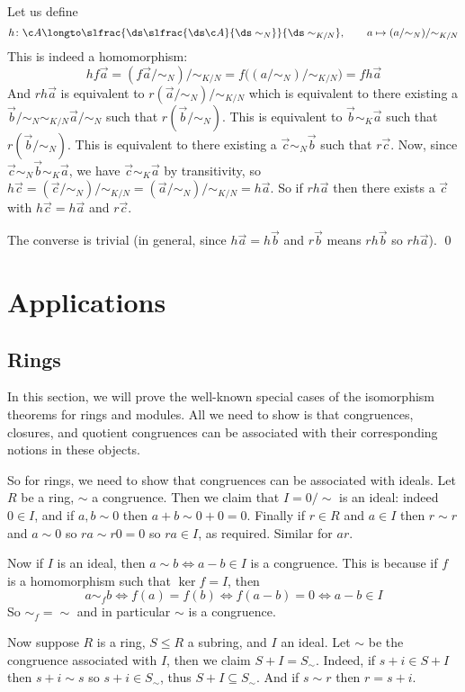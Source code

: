     \item Let us define
    $$ h\colon\c A\longto\slfrac{\ds\slfrac{\ds\c A}{\ds\sim_N}}{\ds\sim_{K/N}},\qquad a\mapsto(a/{\sim_N})/{\sim_{K/N}} $$
    This is indeed a homomorphism:
    $$ hf\vec a = (f\vec a/{\sim_N})/{\sim_{K/N}} = f\bigl((a/{\sim_N})/{\sim_{K/N}}\bigr) = fh\vec a $$
    And $rh\vec a$ is equivalent to $r(\vec a/{\sim_N})/{\sim_{K/N}}$ which is equivalent to there existing a $\vec b/{\sim_N}\sim_{K/N}\vec a/{\sim_N}$ such that $r(\vec b/{\sim_N})$.
    This is equivalent to $\vec b\sim_K\vec a$ such that $r(\vec b/{\sim_N})$.
    This is equivalent to there existing a $\vec c\sim_N\vec b$ such that $r\vec c$.
    Now, since $\vec c\sim_N\vec b\sim_K\vec a$, we have $\vec c\sim_K\vec a$ by transitivity, so $h\vec c=(\vec c/{\sim_N})/{\sim_{K/N}}=(\vec a/{\sim_N})/{\sim_{K/N}}=h\vec a$.
    So if $rh\vec a$ then there exists a $\vec c$ with $h\vec c=h\vec a$ and $r\vec c$.

    The converse is trivial (in general, since $h\vec a=h\vec b$ and $r\vec b$ means $rh\vec b$ so $rh\vec a$).
    \qed
\eenum

\section{Applications}

\subsection{Rings}

In this section, we will prove the well-known special cases of the isomorphism theorems for rings and modules.
All we need to show is that congruences, closures, and quotient congruences can be associated with their corresponding notions in these objects.

So for rings, we need to show that congruences can be associated with ideals.
Let $R$ be a ring, $\sim$ a congruence.
Then we claim that $I=0/{\sim}$ is an ideal: indeed $0\in I$, and if $a,b\sim0$ then $a+b\sim0+0=0$.
Finally if $r\in R$ and $a\in I$ then $r\sim r$ and $a\sim0$ so $ra\sim r0=0$ so $ra\in I$, as required.
Similar for $ar$.

Now if $I$ is an ideal, then $a\sim b\iff a-b\in I$ is a congruence.
This is because if $f$ is a homomorphism such that $\ker f=I$, then
$$ a\sim_fb \iff f(a)=f(b) \iff f(a-b) = 0 \iff a-b\in I $$
So $\sim_f=\sim$ and in particular $\sim$ is a congruence.

Now suppose $R$ is a ring, $S\leq R$ a subring, and $I$ an ideal.
Let $\sim$ be the congruence associated with $I$, then we claim $S+I=S_\sim$.
Indeed, if $s+i\in S+I$ then $s+i\sim s$ so $s+i\in S_\sim$, thus $S+I\subseteq S_\sim$.
And if $s\sim r$ then $r=s+i$.

